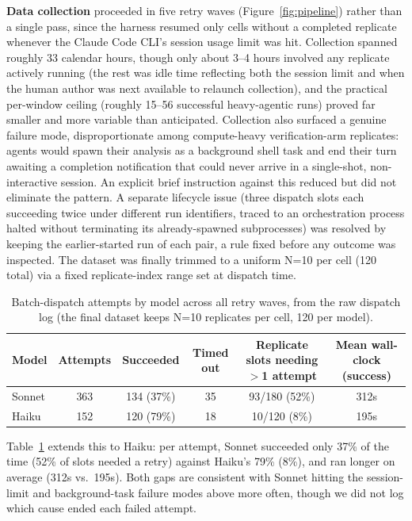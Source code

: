 \documentclass{article}
\begin{document}
\textbf{Data collection} proceeded in five retry waves (Figure~\ref{fig:pipeline}) rather
than a single pass, since the harness resumed only cells without a completed replicate
whenever the Claude Code CLI's session usage limit was hit. Collection spanned roughly 33
calendar hours, though only about 3--4 hours involved any replicate actively running (the
rest was idle time reflecting both the session limit and when the human author was next
available to relaunch collection), and the practical per-window ceiling (roughly 15--56
successful heavy-agentic runs) proved far smaller and more variable than anticipated.
Collection also surfaced a genuine failure mode, disproportionate among compute-heavy
verification-arm replicates: agents would spawn their analysis as a background shell task
and end their turn awaiting a completion notification that could never arrive in a
single-shot, non-interactive session. An explicit brief instruction against this reduced
but did not eliminate the pattern. A separate lifecycle issue (three dispatch slots
each succeeding twice under different run identifiers, traced to an orchestration process
halted without terminating its already-spawned subprocesses) was resolved by keeping the
earlier-started run of each pair, a rule fixed before any outcome was inspected. The
dataset was finally trimmed to a uniform N=10 per cell (120 total) via a fixed
replicate-index range set at dispatch time.

\begin{table}[h]
  \caption{Batch-dispatch attempts by model across all retry waves, from the raw
  dispatch log (the final dataset keeps N=10 replicates per cell, 120 per model).}
  \label{tab:collection}
  \centering
  \footnotesize
  \begin{tabular}{lccccc}
    \toprule
    Model & Attempts & Succeeded & Timed out & Replicate slots needing $>$1 attempt & Mean wall-clock (success) \\
    \midrule
    Sonnet & 363 & 134 (37\%) & 35 & 93/180 (52\%) & 312s \\
    Haiku & 152 & 120 (79\%) & 18 & 10/120 (8\%) & 195s \\
    \bottomrule
  \end{tabular}
\end{table}

Table~\ref{tab:collection} extends this to Haiku: per attempt, Sonnet succeeded only 37\%
of the time (52\% of slots needed a retry) against Haiku's 79\% (8\%), and ran longer on
average (312s vs.\ 195s). Both gaps are consistent with Sonnet hitting the session-limit
and background-task failure modes above more often, though we did not log which cause
ended each failed attempt.
\end{document}
